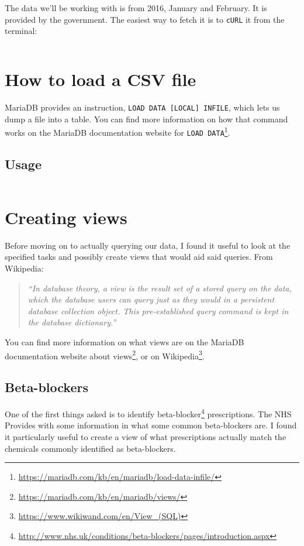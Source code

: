 \documentclass[english,a4paper,]{report}
\renewcommand{\href}[2]{#2\footnote{\url{#1}}}
\begin{document}
The data we'll be working with is from 2016, January and February. It is
provided by the government. The easiest way to fetch it is to
\texttt{cURL} it from the terminal:

\inputminted[lastline=114]{bash}{setup}

\section{How to load a CSV file}\label{how-to-load-a-csv-file}

MariaDB provides an instruction,
\texttt{LOAD\ DATA\ {[}LOCAL{]}\ INFILE}, which lets us dump a file into
a table. You can find more information on how that command works on the
MariaDB documentation website for
\href{https://mariadb.com/kb/en/mariadb/load-data-infile/}{\texttt{LOAD\ DATA}}.

\subsection{Usage}\label{usage}

\inputminted[firstline=55,lastline=97]{sql}{src/sql/00-setup.sql}

\section{Creating views}\label{creating-views}

Before moving on to actually querying our data, I found it useful to
look at the specified tasks and possibly create views that would aid
said queries. From Wikipedia:

\begin{quote}
\emph{``In database theory, a view is the result set of a stored query
on the data, which the database users can query just as they would in a
persistent database collection object. This pre-established query
command is kept in the database dictionary.''}
\end{quote}

You can find more information on what views are on the MariaDB
documentation website
\href{https://mariadb.com/kb/en/mariadb/views/}{about views}, or on
\href{https://www.wikiwand.com/en/View_(SQL)}{Wikipedia}.

\subsection{Beta-blockers}\label{beta-blockers}

One of the first things asked is to identify
\href{http://www.nhs.uk/conditions/beta-blockers/pages/introduction.aspx}{beta-blocker}
prescriptions. The NHS Provides with some information in what some
common beta-blockers are. I found it particularly useful to create a
view of what prescriptions actually match the chemicals commonly
identified as beta-blockers.
\end{document}
